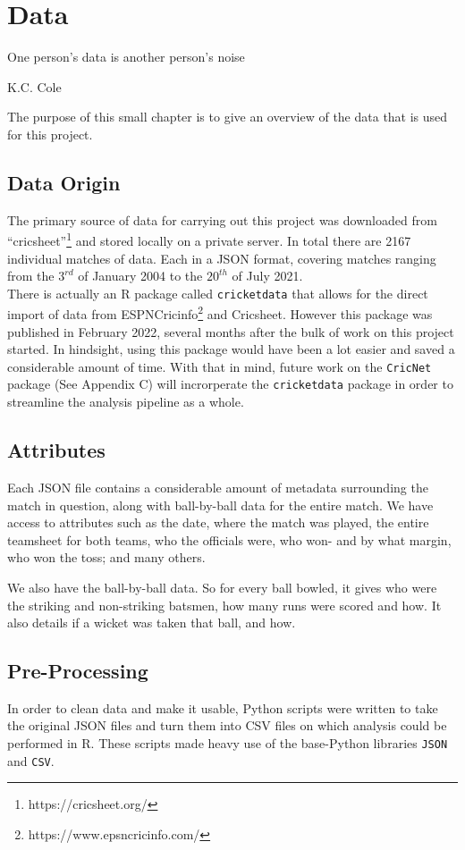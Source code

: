 \chapter{Data}

\epigraph{One person's data is another person's noise}{K.C. Cole}

The purpose of this small chapter is to give an overview of the data that is used for this project.

\section{Data Origin}
The primary source of data for carrying out this project was downloaded from ``cricsheet''\footnote{https://cricsheet.org/}
and stored locally on a private server. In total there are 2167 individual matches of data. Each in a JSON format, 
covering matches ranging from the $3^{rd}$ of January 2004 to the $20^{th}$ of July 2021. \\

There is actually an R package called \verb|cricketdata| that allows for the direct import of data from ESPNCricinfo\footnote{https://www.epsncricinfo.com/}
and Cricsheet. However this package was published in February 2022, several months after the bulk of work on this project started. In hindsight, using this package 
would have been a lot easier and saved a considerable amount of time. With that in mind, future work on the \verb|CricNet| package (See Appendix C)
will incrorperate the \verb|cricketdata| package in order to streamline the analysis pipeline as a whole. 

\section{Attributes}
Each JSON file contains a considerable amount of metadata surrounding the match in question, along with 
ball-by-ball data for the entire match. We have access to attributes such as the date, where the match was played,
the entire teamsheet for both teams, who the officials were, who won- and by what margin, who won the toss; and many others.

We also have the ball-by-ball data. So for every ball bowled, it gives who were the striking and non-striking batsmen, how many runs
were scored and how. It also details if a wicket was taken that ball, and how.

\section{Pre-Processing}
In order to clean data and make it usable, Python scripts were written to take the original JSON files and turn them into CSV files on which analysis could 
be performed in R. These scripts made heavy use of the base-Python libraries \verb|JSON| and \verb|CSV|.


